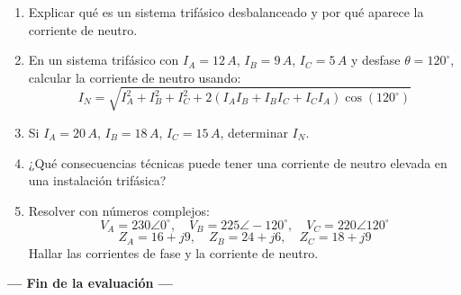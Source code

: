 \documentclass[12pt,a4paper]{article}
\begin{document}
\begin{enumerate}
\item Explicar qué es un sistema trifásico desbalanceado y por qué aparece la corriente de neutro.
\item En un sistema trifásico con \( I_A = 12\,A \), \( I_B = 9\,A \), \( I_C = 5\,A \) y desfase \( \theta = 120^\circ \), calcular la corriente de neutro usando:
\[
I_N = \sqrt{I_A^2 + I_B^2 + I_C^2 + 2(I_A I_B + I_B I_C + I_C I_A)\cos(120^\circ)}
\]
\item Si \( I_A = 20\,A \), \( I_B = 18\,A \), \( I_C = 15\,A \), determinar \( I_N \).
\item ¿Qué consecuencias técnicas puede tener una corriente de neutro elevada en una instalación trifásica?
\item Resolver con números complejos: 
\[
V_A = 230\angle0^\circ,\quad V_B = 225\angle-120^\circ,\quad V_C = 220\angle120^\circ
\]
\[
Z_A = 16+j9,\quad Z_B = 24+j6,\quad Z_C = 18+j9
\]
Hallar las corrientes de fase y la corriente de neutro.
\end{enumerate}

\vspace{2em}
\begin{flushright}
\textbf{--- Fin de la evaluación ---}
\end{flushright}
\end{document}
